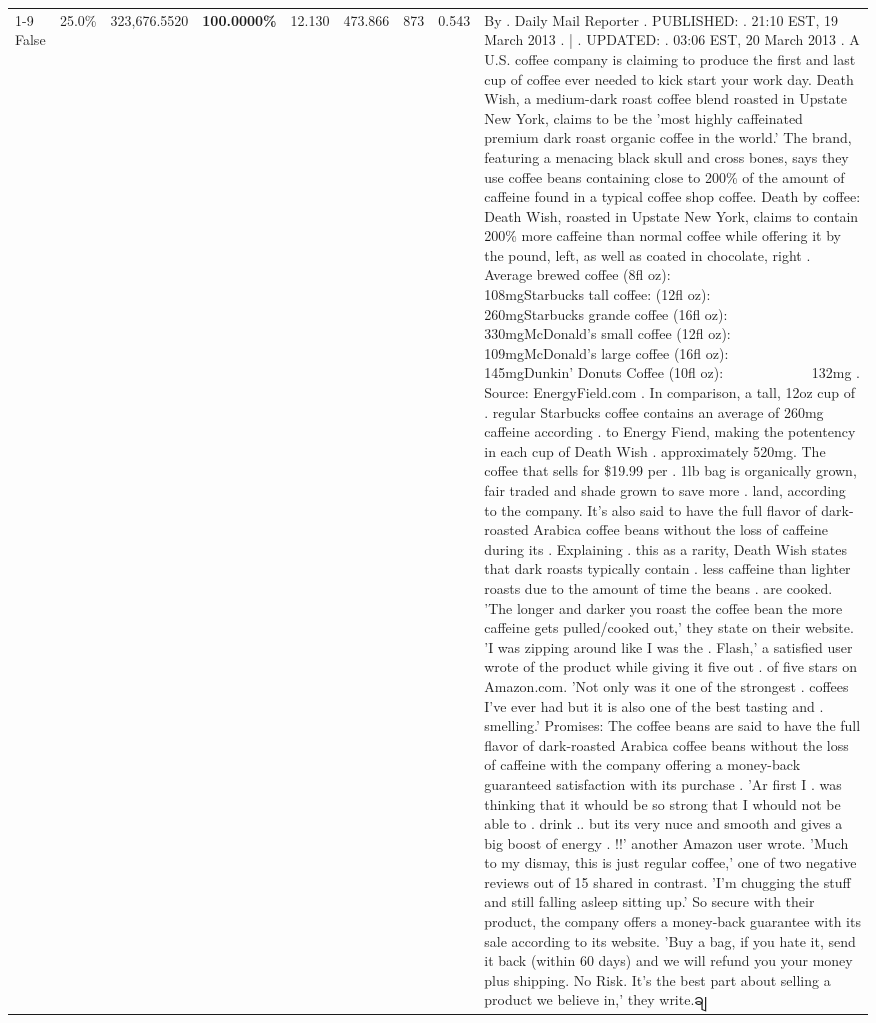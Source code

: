 \begin{table}[H]
{\begin{tabular}{lllrlllll}
\cline{1-9}
False & 25.0\% & 323,676.5520 & \bfseries \color{red} 100.0000\% & 12.130 & 473.866 & 873 & 0.543 & By . Daily Mail Reporter . PUBLISHED: . 21:10 EST, 19 March 2013 . | . UPDATED: . 03:06 EST, 20 March 2013 . A U.S. coffee company is claiming to produce the first and last cup of coffee ever needed to kick start your work day. Death Wish, a medium-dark roast coffee blend roasted in Upstate New York, claims to be the 'most highly caffeinated premium dark roast organic coffee in the world.' The brand, featuring a menacing black skull and cross bones, says they use coffee beans containing close to 200\% of the amount of caffeine found in a typical coffee shop coffee. Death by coffee: Death Wish, roasted in Upstate New York, claims to contain 200\% more caffeine than normal coffee while offering it by the pound, left, as well as coated in chocolate, right . Average brewed coffee (8fl oz):              108mgStarbucks tall coffee: (12fl oz):                260mgStarbucks grande coffee (16fl oz):         330mgMcDonald's small coffee (12fl oz):           109mgMcDonald's large coffee (16fl oz):           145mgDunkin' Donuts Coffee (10fl oz):             132mg . Source: EnergyField.com . In comparison, a tall, 12oz cup of . regular Starbucks coffee contains an average of 260mg caffeine according . to Energy Fiend, making the potentency in each cup of Death Wish . approximately 520mg. The coffee that sells for \$19.99 per . 1lb bag is organically grown, fair traded and shade grown to save more . land, according to the company. It's also said to have the full flavor of dark-roasted Arabica coffee beans without the loss of caffeine during its . Explaining . this as a rarity, Death Wish states that dark roasts typically contain . less caffeine than lighter roasts due to the amount of time the beans . are cooked. 'The longer and darker you roast the coffee bean the more caffeine gets pulled/cooked out,' they state on their website. 'I was zipping around like I was the . Flash,' a satisfied user wrote of the product while giving it five out . of five stars on Amazon.com. 'Not only was it one of the strongest . coffees I've ever had but it is also one of the best tasting and . smelling.’ Promises: The coffee beans are said to have the full flavor of dark-roasted Arabica coffee beans without the loss of caffeine with the company offering a money-back guaranteed satisfaction with its purchase . 'Ar first I . was thinking that it whould be so strong that I whould not be able to . drink .. but its very nuce and smooth and gives a big boost of energy . !!' another Amazon user wrote. 'Much to my dismay, this is just regular coffee,' one of two negative reviews out of 15 shared in contrast. 'I'm chugging the stuff and still falling asleep sitting up.' So secure with their product, the company offers a money-back guarantee with its sale according to its website. 'Buy a bag, if you hate it, send it back (within 60 days) and we will refund you your money plus shipping. No Risk. It’s the best part about selling a product we believe in,' they write.ချ \\

\end{tabular}}
\end{table}
